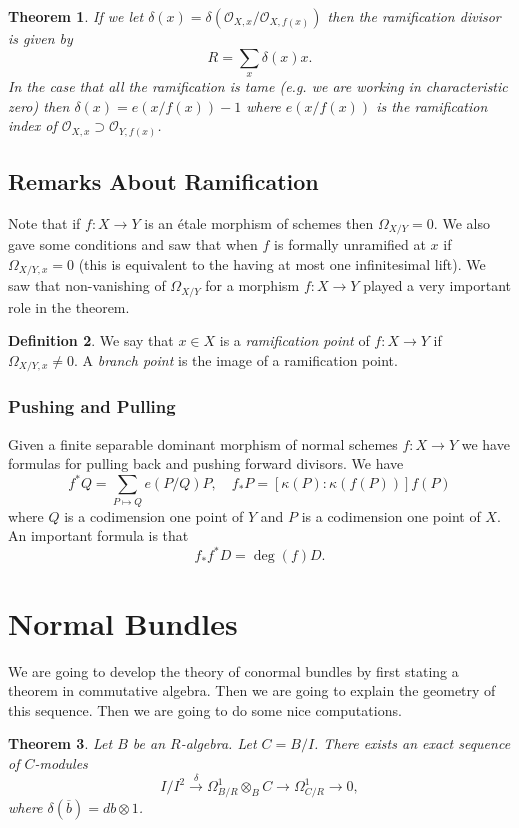 \documentclass[12pt]{article}
\numberwithin{equation}{section}
\newtheorem{theorem}{Theorem}[subsection]
\theoremstyle{definition}
\newtheorem{definition}[theorem]{Definition}
\theoremstyle{remark}
\newcommand{\Ocal}{\mathcal{O}}
\begin{document}
\begin{theorem}
	If we let $\delta(x) = \delta(\Ocal_{X,x}/\Ocal_{X,f(x)})$ then the ramification divisor is given by 
	 $$ R = \sum_{x} \delta(x) x. $$
	In the case that all the ramification is tame (e.g. we are working in characteristic zero) then $\delta(x) = e(x/f(x))-1$ where $e(x/f(x))$ is the ramification index of $\Ocal_{X,x}\supset  \Ocal_{Y,f(x)}$. 
\end{theorem}

\subsection{Remarks About Ramification}
Note that if $f:X\to Y$ is an \'etale morphism of schemes then $\Omega_{X/Y}=0$. 
We also gave some conditions and saw that when $f$ is formally unramified at $x$ if $\Omega_{X/Y,x}=0$ (this is equivalent to the having at most one infinitesimal lift).
We saw that non-vanishing of $\Omega_{X/Y}$ for a morphism $f:X\to Y$ played a very important role in the theorem.
\begin{definition}
	We say that $x\in X$ is a \emph{ramification point} of $f:X\to Y$ if $\Omega_{X/Y,x}\neq 0$. 
	A \emph{branch point} is the image of a ramification point.
\end{definition}

\subsubsection{Pushing and Pulling}
Given a finite separable dominant morphism of normal schemes $f:X\to Y$ we have formulas for pulling back and pushing forward divisors. 
We have 
$$ f^*Q = \sum_{P\mapsto Q }e(P/Q)P, \quad f_*P = [\kappa(P):\kappa(f(P))] f(P) $$
where $Q$ is a codimension one point of $Y$ and $P$ is a codimension one point of $X$.  An important formula is that 
 $$ f_*f^*D = \deg(f) D.$$
 


 
\section{Normal Bundles}
We are going to develop the theory of conormal bundles by first stating a theorem in commutative algebra. 
Then we are going to explain the geometry of this sequence. 
Then we are going to do some nice computations. 

\begin{theorem}
	Let $B$ be an $R$-algebra. 
	Let $C=B/I$. 
	There exists an exact sequence of $C$-modules
	 $$ I/I^2 \xrightarrow{\delta} \Omega_{B/R}^1\otimes_B C \to \Omega^1_{C/R} \to 0,$$
	 where $\delta(\overline{b}) = db\otimes 1$. 
\end{theorem}
\end{document}
